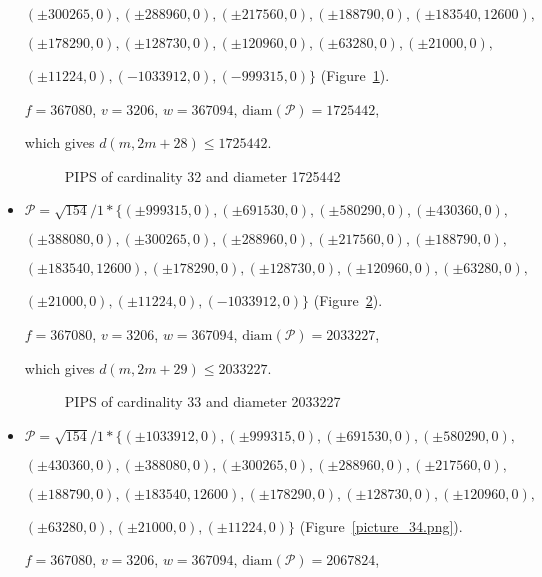 \documentclass[12pt]{article}
\theoremstyle{theorem}
\theoremstyle{dfn}
\theoremstyle{remark}
\begin{document}
\begin{itemize}
$
(\pm 300265, 0),
(\pm 288960, 0),
(\pm 217560, 0),
(\pm 188790, 0),
(\pm 183540, 12600),
$

$
(\pm 178290, 0),
(\pm 128730, 0),
(\pm 120960, 0),
(\pm 63280, 0),
(\pm 21000, 0),
$

$
(\pm 11224, 0),
(-1033912, 0),
(-999315, 0)\}
$
(Figure~\ref{picture_32.png}).

$f = 367080$, $v = 3206$, $w = 367094$, $\operatorname{diam(\mathcal{P})} = 1725442$,

which gives $d(m, 2m + 28) \leq 1725442$.


\begin{figure}[h!]
\parbox{1\linewidth}{\caption{PIPS of cardinality 32 and diameter 1725442}
\label{picture_32.png}}
\end{figure}


\item
$\mathcal{P}=\sqrt{154}/{1} * \{ (\pm 999315, 0),
(\pm 691530, 0),
(\pm 580290, 0),
(\pm 430360, 0),
$

$
(\pm 388080, 0),
(\pm 300265, 0),
(\pm 288960, 0),
(\pm 217560, 0),
(\pm 188790, 0),
$

$
(\pm 183540, 12600),
(\pm 178290, 0),
(\pm 128730, 0),
(\pm 120960, 0),
(\pm 63280, 0),
$

$
(\pm 21000, 0),
(\pm 11224, 0),
(-1033912, 0)\}
$
(Figure~\ref{picture_33.png}).

$f = 367080$, $v = 3206$, $w = 367094$, $\operatorname{diam(\mathcal{P})} = 2033227$,

which gives $d(m, 2m + 29) \leq 2033227$.


\begin{figure}[h!]
\parbox{1\linewidth}{\caption{PIPS of cardinality 33 and diameter 2033227}
\label{picture_33.png}}
\end{figure}


\item
$\mathcal{P}=\sqrt{154}/{1} * \{ (\pm 1033912, 0),
(\pm 999315, 0),
(\pm 691530, 0),
(\pm 580290, 0),
$

$
(\pm 430360, 0),
(\pm 388080, 0),
(\pm 300265, 0),
(\pm 288960, 0),
(\pm 217560, 0),
$

$
(\pm 188790, 0),
(\pm 183540, 12600),
(\pm 178290, 0),
(\pm 128730, 0),
(\pm 120960, 0),
$

$
(\pm 63280, 0),
(\pm 21000, 0),
(\pm 11224, 0)\}
$
(Figure~\ref{picture_34.png}).

$f = 367080$, $v = 3206$, $w = 367094$, $\operatorname{diam(\mathcal{P})} = 2067824$,


\end{itemize}
\end{document}
